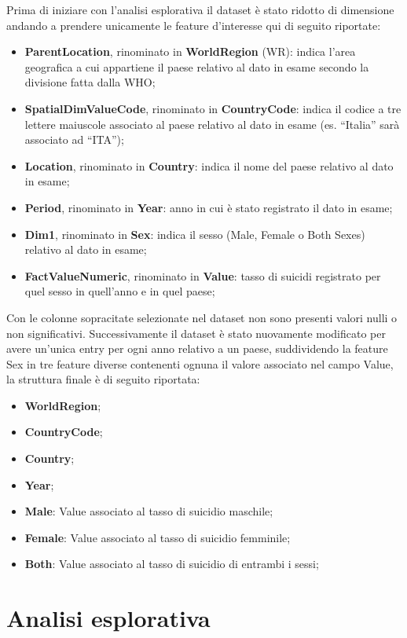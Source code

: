 \documentclass[conference]{IEEEtran}
\begin{document}
Prima di iniziare con l'analisi esplorativa il dataset è stato ridotto di
dimensione andando a prendere unicamente le feature d'interesse qui di seguito
riportate:
\begin{itemize}
    \item \textbf{ParentLocation}, rinominato in \textbf{WorldRegion} (WR): 
    indica l'area geografica a cui appartiene il paese relativo al dato
    in esame secondo la divisione fatta dalla WHO;
    \item \textbf{SpatialDimValueCode}, rinominato in \textbf{CountryCode}: 
    indica il codice a tre lettere maiuscole associato al paese relativo
    al dato in esame (es. ``Italia'' sarà associato ad ``ITA'');
    \item \textbf{Location}, rinominato in \textbf{Country}: 
    indica il nome del paese  relativo al dato in esame;
    \item \textbf{Period}, rinominato in \textbf{Year}: 
    anno in cui è stato registrato il dato in esame;
    \item \textbf{Dim1}, rinominato in \textbf{Sex}: 
    indica il sesso (Male, Female o Both Sexes)
    relativo al dato in esame;
    \item \textbf{FactValueNumeric}, rinominato in \textbf{Value}: 
    tasso di suicidi registrato per quel sesso in quell'anno e in quel paese;
\end{itemize}
Con le colonne sopracitate selezionate nel dataset non sono presenti
valori nulli o non significativi.
Successivamente il dataset è stato nuovamente modificato per
avere un'unica entry per ogni anno relativo a un paese, suddividendo la feature Sex
in tre feature diverse contenenti ognuna il valore associato nel campo Value,
la struttura finale è di seguito riportata:
\begin{itemize}
    \item \textbf{WorldRegion};
    \item \textbf{CountryCode};
    \item \textbf{Country};
    \item \textbf{Year};
    \item \textbf{Male}: Value associato al tasso di suicidio maschile;
    \item \textbf{Female}: Value associato al tasso di suicidio femminile;
    \item \textbf{Both}: Value associato al tasso di suicidio di entrambi i sessi;
\end{itemize}

\section{Analisi esplorativa}
\end{document}
